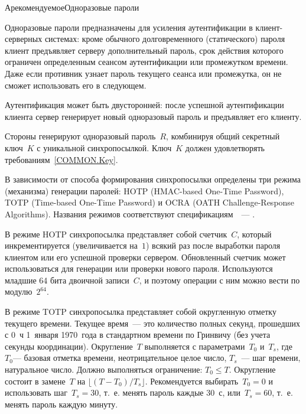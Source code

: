 \providecommand\Name{\text{Name}\xspace}

\begin{appendix}{А}{рекомендуемое}{Одноразовые пароли}
\label{OTP}


Одноразовые пароли предназначены для усиления аутентификации в клиент-серверных системах:
кроме обычного долговременного (статического) пароля клиент 
предъявляет серверу дополнительный пароль, срок действия которого ограничен определенным 
сеансом аутентификации или промежутком времени. Даже если противник узнает 
пароль текущего сеанса или промежутка, он не сможет использовать его в следующем.

Аутентификация может быть двусторонней:
после успешной аутентификации клиента сервер 
генерирует новый одноразовый пароль и предъявляет его клиенту. 


Стороны генерируют одноразовый пароль~$R$,
комбинируя общий секретный ключ~$K$ с уникальной синхропосылкой.
Ключ~$K$ должен удовлетворять требованиям~\ref{COMMON.Key}.

В зависимости от способа формирования синхропосылки определены
три режима (механизма) генерации паролей: 
HOTP (HMAC-based One-Time Password), 
TOTP (Time-based One-Time Password) и 
OCRA (OATH Challenge-Response Algorithms).
Названия режимов соответствуют спецификациям~\cite{HOTP}~--- \cite{OCRA}.

В режиме HOTP синхропосылка представляет собой счетчик~$C$,
который инкрементируется (увеличивается на~$1$) 
всякий раз после выработки пароля клиентом или его успешной 
проверки сервером. 
%
Обновленный счетчик может использоваться для генерации или 
проверки нового пароля.
%
Используются младшие 64 бита двоичной записи~$C$,
и поэтому операции с ним можно вести по модулю~$2^{64}$.

В режиме TOTP синхропосылка представляет собой  
округленную отметку текущего времени. Текущее время~--- это количество полных 
секунд, прошедших с 0~ч 1~января 1970~года в стандартном времени по Гринвичу
(без учета секунды координации). 
%
Округление~$T$ выполняется с параметрами~$T_0$ и~$T_s$,
где~$T_0$--- базовая отметка времени, неотрицательное целое число, 
$T_s$~--- шаг времени, натуральное число. 
%
Должно выполняться ограничение: $T_0\leq T$.
%
Округление состоит в замене~$T$ на $\lfloor(T-T_0)/T_s\rfloor$.
%
Рекомендуется выбирать~$T_0=0$ и использовать шаг~$T_s=30$, 
т.~е. менять пароль каждые 30~с,
или~$T_s=60$, т.~е. менять пароль каждую минуту.


\end{appendix}
